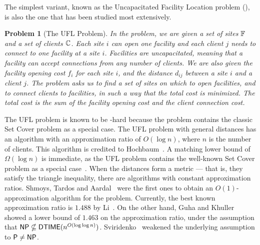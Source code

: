 \documentclass[oneside,final]{ucr}
\newtheorem{problem}[theorem]{Problem}
\begin{document}
The simplest variant, known as the Uncapacitated Facility
Location problem ({\UFL}), is also the one that has been
studied most extensively. 
\begin{problem}[The UFL Problem]
  In the {\UFL} problem, we are given a set of sites
  $\mathbb{F}$ and a set of clients $\mathbb{C}$. Each site
  $i$ can open one facility and each client $j$ needs to
  connect to one facility at a site $i$. Facilities are
  uncapacitated, meaning that a facility can accept
  connections from any number of clients. We are also given
  the facility opening cost $f_i$ for each site $i$, and the
  distance $d_{ij}$ between a site $i$ and a client $j$. The
  problem asks us to find a set of sites on which to open
  facilities, and to connect clients to facilities, in such
  a way that the total cost is minimized. The total cost is
  the sum of the facility opening cost and the client
  connection cost.
\end{problem}
The UFL problem is known to be \NP-hard because the problem
contains the classic Set Cover problem as a special
case. The UFL problem with general distances has an
algorithm with an approximation ratio of $O(\log n)$, where
$n$ is the number of clients. This algorithm is credited to
Hochbaum~\cite{Hochbaum82}. A matching lower bound of
$\Omega(\log n)$ is immediate, as the UFL problem contains
the well-known Set Cover problem as a special
case~\cite{Hochbaum82}. When the distances form a metric ---
that is, they satisfy the triangle inequality, there are
algorithms with constant approximation ratios. Shmoys,
Tardos and Aardal~\cite{ShmoysTA97} were the first ones to
obtain an $O(1)$-approximation algorithm for the {\UFL}
problem. Currently, the best known approximation ratio is
$1.488$ by Li~\cite{Li11}. On the other hand, Guha and
Khuller~\cite{GuhaK98} showed a lower bound of $1.463$ on
the approximation ratio, under the assumption that ${\mbox{\sf NP}}
\nsubseteq {\mbox{\sf DTIME}}(n^{O(\log\log
  n)})$. Sviridenko~\cite{Vygen05} weakened the underlying
assumption to ${\mbox{\sf P}} \neq {\mbox{\sf NP}}$.
\end{document}
